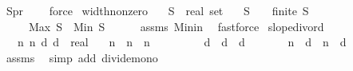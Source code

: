 \begin{isabellebody}
\ {\isachardoublequoteopen}{\isacharquery}{\kern0pt}Spr\ {\isasymnoteq}\ {\isacharbraceleft}{\kern0pt}{\isacharbraceright}{\kern0pt}{\isachardoublequoteclose}\ \isamarkupfalse%
\ force\isanewline
{}\isamarkupfalse%
%
\endisatagproof
{\isafoldproof}%
%
\isadelimproof
\isanewline
%
\endisadelimproof
\isanewline
{}\isamarkupfalse%
\ width{\isacharunderscore}{\kern0pt}non{\isacharunderscore}{\kern0pt}zero{\isacharcolon}{\kern0pt}\isanewline
\ \ \ S\ {\isacharcolon}{\kern0pt}{\isacharcolon}{\kern0pt}\ {\isachardoublequoteopen}real\ set{\isachardoublequoteclose}\isanewline
\ \ \ {\isachardoublequoteopen}S\ {\isasymnoteq}\ {\isacharbraceleft}{\kern0pt}{\isacharbraceright}{\kern0pt}{\isachardoublequoteclose}\ \ {\isachardoublequoteopen}finite\ S{\isachardoublequoteclose}\isanewline
\ \ \ \ \ {\isachardoublequoteopen}Max\ S\ {\isacharminus}{\kern0pt}\ Min\ S\ {\isasymge}\ {}{\isachardoublequoteclose}\isanewline
%
\isadelimproof
\ \ %
\endisadelimproof
%
\isatagproof
{}\isamarkupfalse%
\ assms\ Min{\isacharunderscore}{\kern0pt}in\ \isamarkupfalse%
\ fastforce%
\endisatagproof
{\isafoldproof}%
%
\isadelimproof
\isanewline
%
\endisadelimproof
\isanewline
{}\isamarkupfalse%
\ slope{\isacharunderscore}{\kern0pt}div{\isacharunderscore}{\kern0pt}ord{\isacharcolon}{\kern0pt}\isanewline
\ \ \ n{}\ n{}\ d{}\ d{}\ {\isacharcolon}{\kern0pt}{\isacharcolon}{\kern0pt}\ real\isanewline
\ \ \ {\isachardoublequoteopen}n{}\ {\isasymle}\ n{}{\isachardoublequoteclose}\ \ {\isachardoublequoteopen}n{}\ {\isachargreater}{\kern0pt}\ {}{\isachardoublequoteclose}\isanewline
\ \ \ \ \ \ \ {\isachardoublequoteopen}d{}\ {\isasymge}\ d{}{\isachardoublequoteclose}\ \ {\isachardoublequoteopen}d{}\ {\isachargreater}{\kern0pt}\ {}{\isachardoublequoteclose}\isanewline
\ \ \ \ \ {\isachardoublequoteopen}n{}\ {\isacharslash}{\kern0pt}\ d{}\ {\isasymle}\ n{}\ {\isacharslash}{\kern0pt}\ d{}{\isachardoublequoteclose}\ \isanewline
%
\isadelimproof
\ \ %
\endisadelimproof
%
\isatagproof
{}\isamarkupfalse%
\ assms\ \isamarkupfalse%
\ {\isacharparenleft}{\kern0pt}simp\ add{\isacharcolon}{\kern0pt}\ divide{\isacharunderscore}{\kern0pt}mono{\isacharparenright}{\kern0pt}%

\end{isabellebody}
